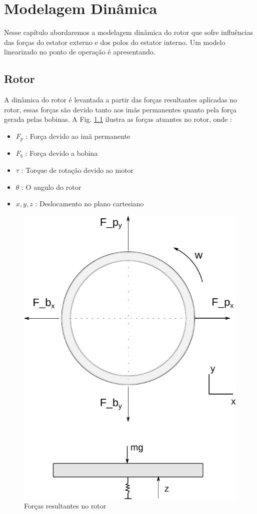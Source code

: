 \pagestyle{empty}
\cleardoublepage
\pagestyle{fancy}

\chapter{Modelagem Dinâmica} \label{Cap:Modelagem:Dinamica}

 Nesse capítulo abordaremos a modelagem dinâmica do rotor que sofre influências das forças do estator externo e dos polos do estator interno. Um modelo linearizado no ponto de operação é apresentando.
 
%



\section{Rotor}

A dinâmica do rotor é levantada a partir das forças resultantes aplicadas no rotor, essas forças são devido tanto aos imãs permanentes quanto pela força gerada pelas bobinas. A Fig. \ref{fig:modelo:forcas} ilustra as forças atuantes no rotor, onde :

 \begin{itemize}
 	\item $F_p$ : Força devido ao imã permanente
 	\item $F_b$ : Força devido a bobina
 	\item $\tau$ : Torque de rotação devido ao motor
 	\item $\theta$ : O angulo do rotor
 	\item $x,y,z$ : Deslocamento no plano cartesiano 
 \end{itemize}

 \begin{figure}[th]
 	\centering
 	\includegraphics[width=0.5\linewidth]{../Figs/Modelagem/forcas}
 	\caption{Forças resultantes no rotor}
 	\label{fig:modelo:forcas}
 \end{figure}
 
